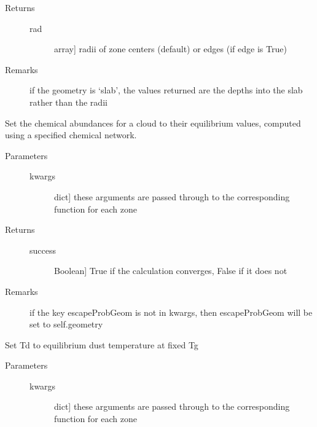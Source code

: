 \documentclass[letterpaper,10pt,english]{sphinxmanual}
\begin{document}
\begin{fulllineitems}
\begin{fulllineitems}
\begin{description}
\item[{Returns}] \leavevmode\begin{description}
\item[{rad}] \leavevmode{[}array{]}
radii of zone centers (default) or edges (if edge is
True)

\end{description}

\item[{Remarks}] \leavevmode
if the geometry is `slab', the values returned are the
depths into the slab rather than the radii

\end{description}

\end{fulllineitems}


\begin{fulllineitems}
\label{fulldoc:despotic.zonedcloud.setChemEq}
Set the chemical abundances for a cloud to their equilibrium
values, computed using a specified chemical network.
\begin{description}
\item[{Parameters}] \leavevmode\begin{description}
\item[{kwargs}] \leavevmode{[}dict{]}
these arguments are passed through to the corresponding
function for each zone

\end{description}

\item[{Returns}] \leavevmode\begin{description}
\item[{success}] \leavevmode{[}Boolean{]}
True if the calculation converges, False if it does not

\end{description}

\item[{Remarks}] \leavevmode
if the key escapeProbGeom is not in kwargs, then
escapeProbGeom will be set to self.geometry

\end{description}

\end{fulllineitems}


\begin{fulllineitems}
\label{fulldoc:despotic.zonedcloud.setDustTempEq}
Set Td to equilibrium dust temperature at fixed Tg
\begin{description}
\item[{Parameters}] \leavevmode\begin{description}
\item[{kwargs}] \leavevmode{[}dict{]}
these arguments are passed through to the corresponding
function for each zone


\end{description}
\end{description}
\end{fulllineitems}
\end{fulllineitems}
\end{document}
